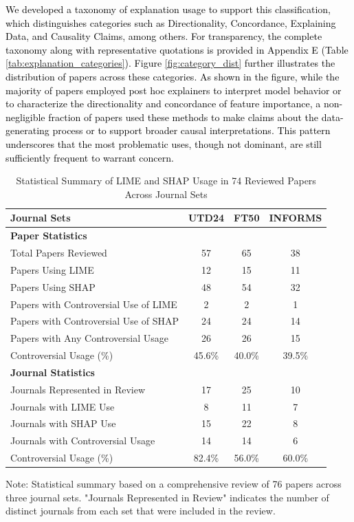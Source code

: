 \documentclass[mnsc,blindrev]{informs3}
\begin{document}
\textcolor{black}{We developed a taxonomy of explanation usage to support this classification, which distinguishes categories such as Directionality, Concordance, Explaining Data, and Causality Claims, among others. For transparency, the complete taxonomy along with representative quotations is provided in Appendix E (Table \ref{tab:explanation_categories}). Figure \ref{fig:category_dist} further illustrates the distribution of papers across these categories. As shown in the figure, while the majority of papers employed post hoc explainers to interpret model behavior or to characterize the directionality and concordance of feature importance, a non-negligible fraction of papers used these methods to make claims about the data-generating process or to support broader causal interpretations. This pattern underscores that the most problematic uses, though not dominant, are still sufficiently frequent to warrant concern.}

\begin{table}[htbp]
\centering
\caption{Statistical Summary of LIME and SHAP Usage in 74 Reviewed Papers Across Journal Sets}
\label{tab:literature_review}
\begin{tabular}{lccc}
\toprule
\textbf{Journal Sets} & \textbf{UTD24} & \textbf{FT50} & \textbf{INFORMS} \\
\midrule
\multicolumn{4}{l}{\textbf{Paper Statistics}} \\
\quad Total Papers Reviewed & 57 & 65 & 38 \\
\quad Papers Using LIME & 12 & 15 & 11 \\
\quad Papers Using SHAP & 48 & 54 & 32 \\
\quad Papers with Controversial Use of LIME & 2 & 2 & 1 \\
\quad Papers with Controversial Use of SHAP & 24 & 24 & 14 \\
\quad Papers with Any Controversial Usage & 26 & 26 & 15 \\
\quad Controversial Usage (\%) & 45.6\% & 40.0\% & 39.5\% \\
\midrule
\multicolumn{4}{l}{\textbf{Journal Statistics}} \\
\quad Journals Represented in Review & 17 & 25 & 10 \\
\quad Journals with LIME Use & 8 & 11 & 7 \\
\quad Journals with SHAP Use & 15 & 22 & 8 \\
\quad Journals with Controversial Usage & 14 & 14 & 6 \\
\quad Controversial Usage (\%) & 82.4\% & 56.0\% & 60.0\% \\
\bottomrule
\end{tabular}

\smallskip
\footnotesize
Note: Statistical summary based on a comprehensive review of 76 papers across three journal sets. 
"Journals Represented in Review" indicates the number of distinct journals from each set that were included in the review.
\end{table}
\end{document}
